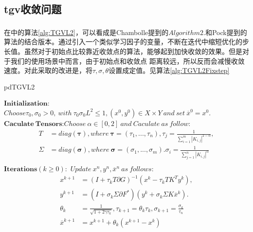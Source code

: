\documentclass[UTF8]{ctexart}
\newcommand{\myciteup}[1]{\textsuperscript{\textsuperscript{\cite{#1}}}}
\begin{document}
\begin{sloppypar}
        \subsection{tgv收敛问题}
        在\myciteup{Ferstl2013}中的算法\ref{alg:TGVL2}，可以看成是Chambolle\myciteup{Chambolle2011}提到的$Algorithm 2.$和Pock\myciteup{Diagonal_preconditioning}提到的算法的结合版本。通过引入一个类似学习因子的变量，不断在迭代中缩短优化的步长值。虽然对于初始点比较靠近收敛点的算法，能够起到加快收敛的效果。但是对于我们的使用场景中而言，由于初始点和收敛点
        距离较远，所以反而会减慢收敛速度。对此采取的改进是，将$\tau , \sigma,  \theta $设置成定值。见算法\ref{alg:TGVL2Fixstep}
        \begin{algorithm}
            \caption{pdTGVL2}
            \begin{algorithmic}
                \STATE $\bm{Initialization}$: $Choose \tau_0,\sigma_0 >0, \ with\ \tau_0\sigma_{0}L^2\leq 1, (x^0,y^0)\in X\times Y \ and \ set\ \overline{x}^0=x^0.$
                \STATE $\bm{Caculate\ Tensors}$:$Choose\ \alpha \in[0,2]\ and\ Caculate\ as\ follow:$
                \begin{equation}
                    \begin{aligned}
                        T &= diag(\bm{\tau}) , where\ \bm{\tau} = (\tau_1,...,\tau_n),\tau_j=\frac{1}{\sum_{i=1}^m\left| K_{i,j} \right|^{2-\alpha}},\\
                        \Sigma &= diag(\bm{\sigma}),where\ \bm{\sigma} = (\sigma_1,...,\sigma_m).\sigma_i=\frac{1}{\sum_{j=1}^n\left| K_{i,j} \right|^{\alpha}}\\
                    \end{aligned}
                \end{equation}
                \STATE $\bm{Iterations}(k\geq 0)$:\ $Update\ x^n,y^n,\overline{x}^n\ as\ follows:$
                \begin{equation}
                    \begin{aligned}
                        x^{k+1} &=(I+\tau_k T\partial G)^{-1}(x^k-\tau_k TK^Ty^k ), \\
                        y^{k+1} &=(I+\sigma_k\Sigma\partial F^*)(y^k+\sigma_k \Sigma K\overline{x}^k).\\
                        \theta_k &= \frac{1}{\sqrt {1+2\gamma \tau_k}},\tau_{k+1}=\theta_k\tau_k,\sigma_{k+1}=\frac{\sigma_k}{\tau_n}\\
                        \overline{x}^{k+1} &= x^{k+1}+\theta_k(x^{k+1}-x^k)\\

\end{aligned}
\end{equation}
\end{algorithmic}
\end{algorithm}
\end{sloppypar}
\end{document}
